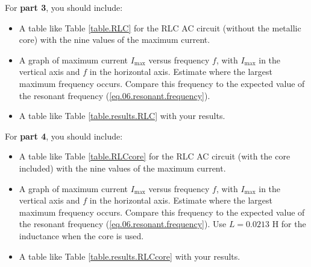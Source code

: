 For \textbf{part 3}, you should include:
\begin{itemize}
	\item A table like Table \ref{table.RLC} for the RLC AC circuit (without the metallic core) with the nine values of the maximum current.
	\item A graph of maximum current $I_{\text{max}}$ versus frequency $f$, with $I_{\text{max}}$ in the vertical axis and $f$ in the horizontal axis. Estimate where the largest maximum frequency occurs. Compare this frequency to the expected value of the resonant frequency (\ref{eq.06.resonant.frequency}).
	\item A table like Table \ref{table.results.RLC} with your results.
\end{itemize}
For \textbf{part 4}, you should include:
\begin{itemize}
	\item A table like Table \ref{table.RLCcore} for the RLC AC circuit (with the core included) with the nine values of the maximum current.
	\item A graph of maximum current $I_{\text{max}}$ versus frequency $f$, with $I_{\text{max}}$ in the vertical axis and $f$ in the horizontal axis. Estimate where the largest maximum frequency occurs. Compare this frequency to the expected value of the resonant frequency (\ref{eq.06.resonant.frequency}). Use $L = 0.0213$ H for the inductance when the core is used.
	\item A table like Table \ref{table.results.RLCcore} with your results.
\end{itemize}
